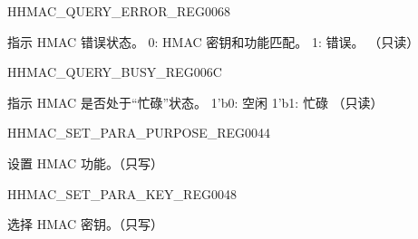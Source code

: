 \begin{register}{H}{HMAC\_QUERY\_ERROR\_REG}{\hexprefix{}0068}\label{regdesc:HMACQUERYERRORREG}
%
%
\regnewline%
\begin{regdesc}\begin{reglist}
\label{fielddesc:HMACQUREYCHECK}\item [HMAC\_QUREY\_CHECK] 指示 HMAC 错误状态。
0: HMAC 密钥和功能匹配。
1: 错误。
（只读）
\end{reglist}\end{regdesc}
\end{register}


\begin{register}{H}{HMAC\_QUERY\_BUSY\_REG}{\hexprefix{}006C}\label{regdesc:HMACQUERYBUSYREG}
%
%
\regnewline%
\begin{regdesc}\begin{reglist}
\label{fielddesc:HMACBUSYSTATE}\item [HMAC\_BUSY\_STATE] 指示 HMAC 是否处于“忙碌”状态。
1'b0: 空闲
1'b1: 忙碌
（只读）
\end{reglist}\end{regdesc}
\end{register}


\begin{register}{H}{HMAC\_SET\_PARA\_PURPOSE\_REG}{\hexprefix{}0044}\label{regdesc:HMACSETPARAPURPOSEREG}
%
%
\regnewline%
\begin{regdesc}\begin{reglist}
\label{fielddesc:HMACPURPOSESET}\item [HMAC\_PURPOSE\_SET] 设置 HMAC 功能。（只写）
\end{reglist}\end{regdesc}
\end{register}


\begin{register}{H}{HMAC\_SET\_PARA\_KEY\_REG}{\hexprefix{}0048}\label{regdesc:HMACSETPARAKEYREG}
%
%
\regnewline%
\begin{regdesc}\begin{reglist}
\label{fielddesc:HMACKEYSET}\item [HMAC\_KEY\_SET] 选择 HMAC 密钥。（只写）
\end{reglist}\end{regdesc}
\end{register}


